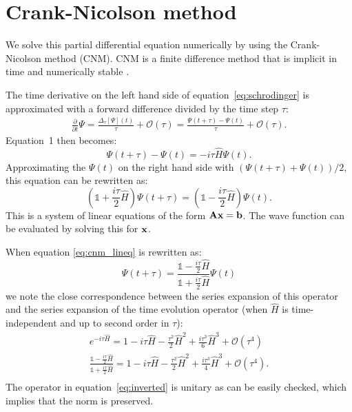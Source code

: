 \section*{Crank-Nicolson method}
We solve this partial differential equation numerically by using the Crank-Nicolson method (CNM). CNM is a finite difference method that is implicit in time and numerically stable \cite{cnm}. 

The time derivative on the left hand side of equation~\ref{eq:schrodinger} is approximated with a forward difference divided by the time step $\tau$:
\begin{gather*}
    \frac{\partial}{\partial t}\Psi 
    = \frac{\Delta_\tau[\Psi](t)}{\tau} + \mathcal{O}(\tau)
    = \frac{\Psi(t + \tau) - \Psi(t)}{\tau} + \mathcal{O}(\tau).
\end{gather*} Equation~1 then becomes:
\[
    \Psi(t+\tau)-\Psi(t) 
    = -i\tau\hat{H}\Psi(t).
\] Approximating the $\Psi(t)$ on the right hand side with $\left(\Psi(t+\tau)+\Psi(t)\right)/2$, this equation can be rewritten as:
\begin{equation}\label{eq:cnm_lineq}
    \left(\mathbb{1}+\frac{i\tau}{2}\hat{H}\right)\Psi(t+\tau) 
    = \left(\mathbb{1}-\frac{i\tau}{2}\hat{H}\right)\Psi(t).
\end{equation} This is a system of linear equations of the form $\mathbf{A}\vb{x}=\vb{b}$. The wave function can be evaluated by solving this for $\vb{x}$. 

When equation \ref{eq:cnm_lineq} is rewritten as:
\begin{equation}\label{eq:inverted}
\Psi(t+\tau) 
    = \frac{\mathbb{1}-\frac{i\tau}{2}\hat{H}}{\mathbb{1}+\frac{i\tau}{2}\hat{H}}\Psi(t)
\end{equation} we note the close correspondence between the series expansion of this operator and the series expansion of the time evolution operator (when $\hat{H}$ is time-independent and up to second order in $\tau$):
\begin{gather*}
    e^{-i\tau\hat{H}} 
    = 1 - i \tau\hat{H} - \frac{\tau^2}{2}\hat{H}^2 + \frac{i\tau^3}{6}\hat{H}^3 + \mathcal{O}(\tau^4)\\
    \frac{\mathbb{1}-\frac{i\tau}{2}\hat{H}}{\mathbb{1}+\frac{i\tau}{2}\hat{H}} 
    = 1 - i \tau\hat{H} - \frac{\tau^2}{2}\hat{H}^2 + \frac{i\tau^3}{4}\hat{H}^3 + \mathcal{O}(\tau^4).\\
\end{gather*}
The operator in equation~\ref{eq:inverted} is unitary as can be easily checked, which implies that the norm is preserved.

